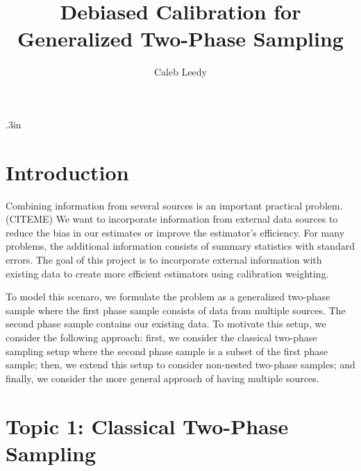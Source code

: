 \documentclass[12pt]{article}
\begin{document}
\title{Debiased Calibration for Generalized Two-Phase Sampling}
\author{Caleb Leedy}
\maketitle 

\baselineskip .3in

\section{Introduction}

Combining information from several sources is an important practical problem. (CITEME)
We want to incorporate information from external data sources to reduce the bias
in our estimates or improve the estimator's efficiency. For many problems, the
additional information consists of summary statistics with standard errors. The
goal of this project is to incorporate external information with existing data 
to create more efficient estimators using calibration weighting.

To model this scenaro, we formulate the problem as a generalized two-phase
sample where the first phase sample consists of data from multiple sources. The
second phase sample contains our existing data. To motivate this setup, we
consider the following approach: first, we consider the classical two-phase
sampling setup where the second phase sample is a subset of the first phase
sample; then, we extend this setup to consider non-nested two-phase samples;
and finally, we consider the more general approach of having multiple sources.


\section{Topic 1: Classical Two-Phase Sampling}
\end{document}
